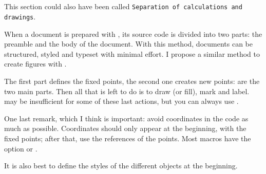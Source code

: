 \subsection{}
This section could also have been called \texttt{Separation of calculations and drawings}.

When a document is prepared with \LATEX, its source code is divided into two parts: the preamble and the body of the document.
With this method, documents can be structured, styled and typeset with minimal effort.
I propose a similar method to create figures with \tkzname{\tkznameofpack}.

The first part defines the fixed points, the second one creates new points:  are the two main parts. Then all that is left to do is to draw (or fill), mark and label. \tkzname{\tkznameofpack} may be insufficient for some of these last actions, but you can always use \TIKZ.

One last remark, which I think is important: avoid coordinates in the code as much as possible. Coordinates should only appear at the beginning, with the fixed points; after that, use the references of the points. Most macros have the option  or .

It is also best to define the styles of the different objects at the beginning.
\endinput